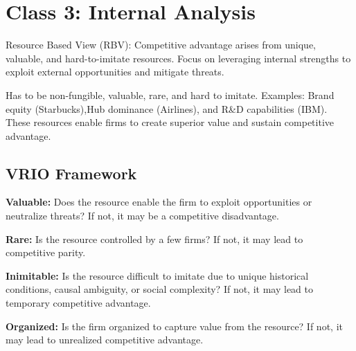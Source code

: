 \section{Class 3: Internal Analysis}
Resource Based View (RBV): Competitive advantage arises from unique, valuable,
and hard-to-imitate resources. Focus on leveraging internal strengths to
exploit external opportunities and mitigate threats.

Has to be non-fungible, valuable, rare, and hard to imitate. Examples: Brand
equity (Starbucks),Hub dominance (Airlines), and R\&D capabilities (IBM). These
resources enable firms to create superior value and sustain competitive
advantage.

\subsection{VRIO Framework}
\textbf{Valuable:} Does the resource enable the firm to exploit opportunities or
neutralize threats? If not, it may be a competitive disadvantage.

\textbf{Rare:} Is the resource controlled by a few firms? If not, it may lead to
competitive parity.

\textbf{Inimitable:} Is the resource difficult to imitate due to unique historical
conditions, causal ambiguity, or social complexity? If not, it may lead to
temporary competitive advantage.

\textbf{Organized:} Is the firm organized to capture value from the resource? If not,
it may lead to unrealized competitive advantage.

